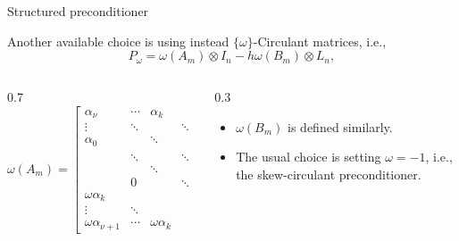 \documentclass[aspectratio=169,xcolor=dvipsnames]{beamer}
\begin{document}
\begin{frame}{Structured preconditioner}

Another available choice is using instead $\{\omega\}$-Circulant matrices, i.e.,
\[
P_\omega = \omega(A_m)\otimes I_n - h \omega(B_m)\otimes L_n,
\]
\vspace{-2em}\begin{columns}
\begin{column}{0.7\columnwidth}\small
\[
\omega(A_m) =\begin{bmatrix} \alpha_{\nu} &\cdots &\alpha_k &   &
	&
	&\omega\alpha_0 &\cdots &\omega\alpha_{\nu-1}\\
	\vdots &    \ddots         &   &    \ddots   &   & &              &
	\ddots &   \vdots  \\
	\alpha_0 &         &   \ddots     & & \ddots &     &    &  & \omega\alpha_0 \\
	& \ddots & &  \ddots      & &\ddots  &        &  0 &   \\
	&   & \ddots   &         & \ddots & & \ddots    &        \\
	& 0 &        & \ddots & &  \ddots & & \ddots  &    \\
	\omega\alpha_k &         & &            & \ddots & & \ddots & &  \alpha_k \\
	\vdots & \ddots       &  & & & \ddots &  & \ddots & \vdots \\
	\omega\alpha_{\nu+1}&\cdots  & \omega\alpha_k &   & &        &
	\alpha_0 & \cdots &  \alpha_{\nu}
\end{bmatrix},
\]
\end{column}
\begin{column}{0.3\columnwidth}
\begin{itemize}
	\item[\faCog] $\omega(B_m)$ is defined similarly.
	\item[\faHammer] The usual choice is setting $\omega = -1$, i.e., the skew-circulant preconditioner.
\end{itemize}
\end{column}
\end{columns}
\end{frame}
\end{document}
